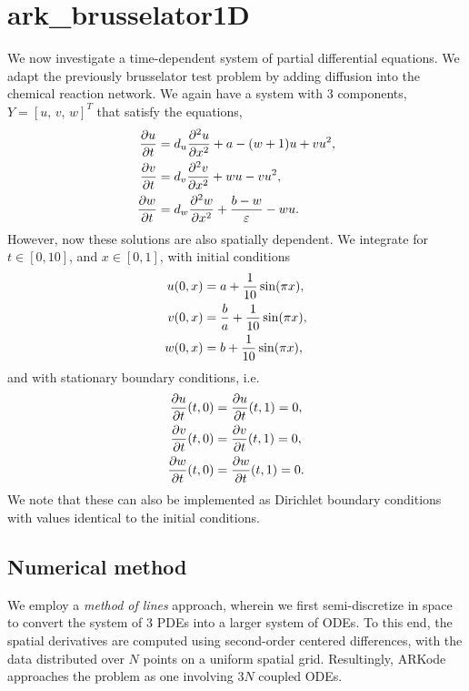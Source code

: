 \documentclass[letterpaper,10pt,english]{sphinxmanual}
\begin{document}
\section{ark\_brusselator1D}
\label{c_serial:ark-brusselator1d}\label{c_serial:id16}
We now investigate a time-dependent system of partial differential
equations.  We adapt the previously brusselator test problem by adding
diffusion into the chemical reaction network.  We again have a system
with 3 components, \(Y = [u,\, v,\, w]^T\) that satisfy the equations,
\begin{gather}
\begin{split}\frac{\partial u}{\partial t} &= d_u \frac{\partial^2 u}{\partial
   x^2} + a - (w+1) u + v u^2, \\
\frac{\partial v}{\partial t} &= d_v \frac{\partial^2 v}{\partial
   x^2} + w u - v u^2, \\
\frac{\partial w}{\partial t} &= d_w \frac{\partial^2 w}{\partial
   x^2} + \frac{b-w}{\varepsilon} - w u.\end{split}\notag
\end{gather}
However, now these solutions are also spatially dependent.  We
integrate for \(t \in [0, 10]\), and \(x \in [0, 1]\), with
initial conditions
\begin{gather}
\begin{split}u(0,x) &=  a + \frac{1}{10} \sin(\pi x),\\
v(0,x) &= \frac{b}{a} + \frac{1}{10}\sin(\pi x),\\
w(0,x) &=  b + \frac{1}{10}\sin(\pi x),\end{split}\notag
\end{gather}
and with stationary boundary conditions, i.e.
\begin{gather}
\begin{split}\frac{\partial u}{\partial t}(t,0) &= \frac{\partial u}{\partial t}(t,1) = 0,\\
\frac{\partial v}{\partial t}(t,0) &= \frac{\partial v}{\partial t}(t,1) = 0,\\
\frac{\partial w}{\partial t}(t,0) &= \frac{\partial w}{\partial t}(t,1) = 0.\end{split}\notag
\end{gather}
We note that these can also be implemented as Dirichlet boundary
conditions with values identical to the initial conditions.


\subsection{Numerical method}
\label{c_serial:id17}
We employ a \emph{method of lines} approach, wherein we first
semi-discretize in space to convert the system of 3 PDEs into a larger
system of ODEs.  To this end, the spatial derivatives are computed
using second-order centered differences, with the data distributed
over \(N\) points on a uniform spatial grid.  Resultingly, ARKode
approaches the problem as one involving \(3N\) coupled ODEs.
\end{document}

